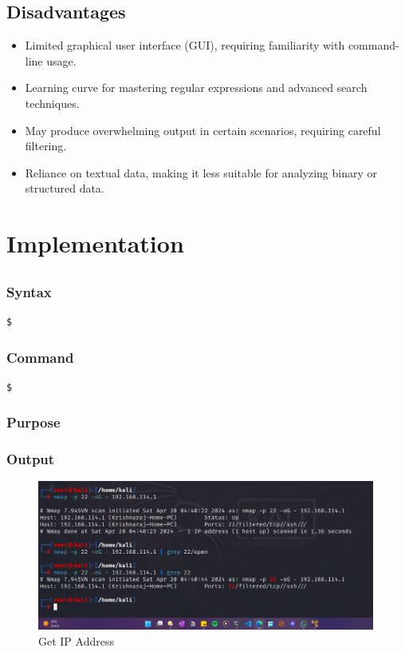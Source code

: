 \documentclass[11pt]{article}
\begin{document}
\subsection{Disadvantages}
\begin{itemize}
    \item Limited graphical user interface (GUI), requiring familiarity with command-line usage.
    \item Learning curve for mastering regular expressions and advanced search techniques.
    \item May produce overwhelming output in certain scenarios, requiring careful filtering.
    \item Reliance on textual data, making it less suitable for analyzing binary or structured data.
\end{itemize}


\section{Implementation}

\subsection{}

\subsubsection*{Syntax}
\begin{verbatim}
$
\end{verbatim}

\subsubsection*{Command}
\begin{verbatim}
$
\end{verbatim}

\subsubsection*{Purpose}

\subsubsection*{Output}
\begin{figure}[H]
    \centering
    \includegraphics[width=0.99\textwidth]{Screenshot 2024-04-20 141054.png}
    \caption{Get IP Address}
    \label{fig:1}
\end{figure}
\end{document}
